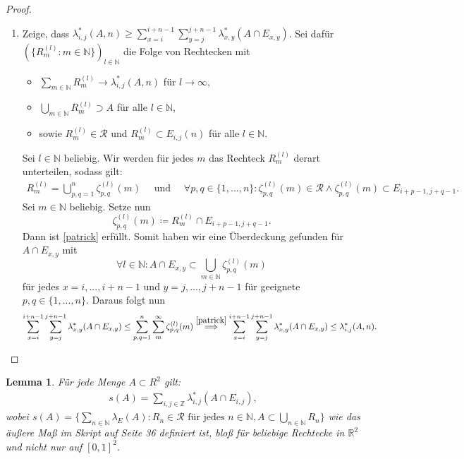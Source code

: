 \documentclass[a4paper,DIV=1]{article}
\theoremstyle{plain}
\newtheorem{lemma}{Lemma}
\begin{document}
\begin{proof}
\begin{enumerate}
		 \item  Zeige, dass $\lambda_{i,j}^*(A,n) \geq  \sum^{i+n-1}_{x=i}\sum^{j+n-1}_{y=j} \lambda_{x,y}^*(A \cap E_{x,y})$. Sei dafür $(\{ R_m^{(l)}: m \in \mathbb N\})_{l \in \mathbb N}$ die Folge von Rechtecken mit 
		 \begin{itemize}
		 	\item $\sum_{m \in \mathbb N}R_m^{(l)} \to \lambda_{i,j}^*(A,n)$ für $l \to \infty$,
		 	\item $\bigcup\limits_{m \in \mathbb N}R_m^{(l)} \supset A$ für alle $l \in \mathbb N$,
		 	\item sowie $R_m^{(l)} \in \mathcal R$ und $R_m^{(l)} \subset E_{i,j}(n)$ für alle $l \in \mathbb N$.
		 \end{itemize}
	 	 Sei $l \in \mathbb N$ beliebig. Wir werden für jedes $m$ das Rechteck $R^{(l)}_m$ derart unterteilen, sodass gilt: 
	 	 \begin{gather}\label{patrick}
	 	 	R^{(l)}_m = \bigcup_{p,q = 1}^{n}\zeta_{p,q}^{(l)}(m) \quad \text{ und } \quad 
	 	 	\forall p,q \in \{1,...,n\}:  \zeta_{p,q}^{(l)}(m)\in \mathcal R \land \zeta_{p,q}^{(l)}(m) \subset E_{i+p-1,j+q-1}. 
	 	 \end{gather}
	 	 Sei $m \in \mathbb N$ beliebig. Setze nun
	 	 \[
	 	 	\zeta^{(l)}_{p,q}(m) \coloneqq R_m^{(l)} \cap E_{i+p-1,j+q-1}.
	 	 \]
	 	 Dann ist \eqref{patrick} erfüllt. Somit haben wir eine Überdeckung gefunden für $A \cap E_{x,y}$ mit $$\forall l \in \mathbb N: A \cap E_{x,y} \subset \bigcup_{m \in \mathbb N} \zeta_{p,q}^{(l)}(m)$$ für jedes $x=i,...,i+n-1$ und $y = j,...,j+n-1$ für geeignete $p,q \in \{1,...,n\}$. Daraus folgt nun
	 	 \[
	 	 	 \sum^{i+n-1}_{x=i}\sum^{j+n-1}_{y=j} \lambda_{x,y}^*(A \cap E_{x,y}) \leq  \sum^{n}_{p,q=1} \sum_{m}^{\infty} \zeta^{(l)}_{p,q}(m) \overset{\eqref{patrick}}{\implies}  \sum^{i+n-1}_{x=i}\sum^{j+n-1}_{y=j} \lambda_{x,y}^*(A \cap E_{x,y}) \leq  \lambda_{i,j}^*(A,n).
	 	 \]
	\end{enumerate}
\end{proof}

\begin{lemma}\label{superman}
	Für jede Menge $A \subset R^2$ gilt:
	\begin{align}
		s(A) = \sum_{i,j \in \mathbb Z}\lambda^*_{i,j}(A \cap E_{i,j}),
	\end{align}
	wobei $s(A) = \{ \sum_{n \in \mathbb N} \lambda_E(A) :  R_n \in \mathcal R \text{ für jedes }n \in \mathbb N, A \subset \bigcup\limits_{n \in \mathbb N} R_n\}$ wie das äußere Maß im Skript auf Seite 36 definiert ist, bloß für beliebige Rechtecke in $\mathbb R^2$ und nicht nur auf $[0,1]^2$.
\end{lemma}
\end{document}
